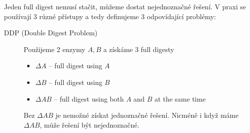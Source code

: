 \documentclass[11pt]{report} %
\numberwithin{equation}{section}
\begin{document}
Jeden full digest nemusí stačit, můžeme dostat nejednoznačné řešení. V praxi se používají 3 různé přístupy a tedy definujeme 3 odpovídající problémy:
\begin{description}
	\item[DDP (Double Digest Problem)] Použijeme 2 enzymy $A, B$ a získáme 3 full digesty
	\begin{itemize}
		\item $\Delta A$ -- full digest using $A$
		\item $\Delta B$ -- full digest using $B$
		\item $\Delta AB$ -- full digest using both $A$ and $B$ at the same time
	\end{itemize} 
	Bez $\Delta AB$ je nemožné získat jednoznačné řešení. Nicméně i když máme $\Delta AB$, může řešení být nejednoznačné.
	

\end{description}
\end{document}
